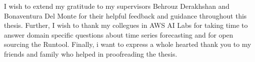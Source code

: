 I wish to extend my gratitude to my supervisors Behrouz Derakhshan and Bonaventura Del Monte for their helpful feedback and guidance throughout this thesis. Further, I wish to thank my collegues in AWS AI Labs for taking time to answer domain specific questions about time series forecasting and for open sourcing the Runtool. Finally, i want to express a whole hearted thank you to my friends and family who helped in proofreading the thesis.